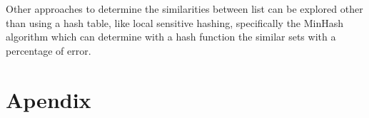 \documentclass[a4paper,12pt]{article}
\begin{document}
Other approaches to determine the similarities between list can be explored other than using a hash table, like local sensitive hashing, specifically the MinHash algorithm which can determine with a hash function the similar sets with a percentage of error.





\section{Apendix}
\end{document}
